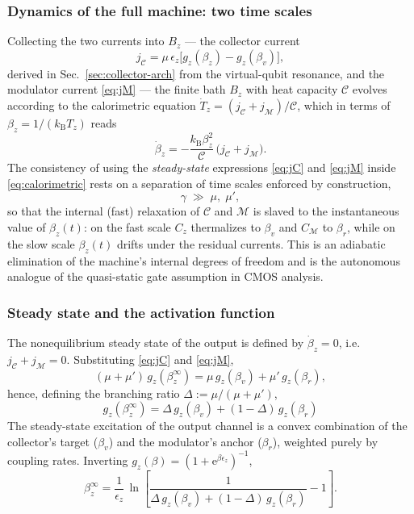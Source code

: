 \documentclass[11pt,a4paper]{article}
\theoremstyle{definition}
\theoremstyle{remark}
\newcommand{\ee}{\mathrm{e}}
\newcommand{\kB}{k_{\mathrm{B}}}
\begin{document}
\subsubsection{Dynamics of the full machine: two time scales}
\label{sec:dynamics}
Collecting the two currents into $B_z$ --- the collector current
\begin{equation}
j_\mathcal{C} = \mu\,\epsilon_z\big[g_z(\beta_z)-g_z(\beta_v)\big],
\label{eq:jC}
\end{equation}
derived in Sec.~\ref{sec:collector-arch} from the virtual-qubit
resonance, and the modulator current \eqref{eq:jM} --- the finite bath
$B_z$ with heat capacity $\mathcal{C}$ evolves according to the
calorimetric equation $\dot T_z = (j_\mathcal{C}+j_\mathcal{M})/\mathcal{C}$,
which in terms of $\beta_z = 1/(\kB T_z)$ reads
\begin{equation}
\dot\beta_z
= -\frac{\kB\beta_z^{2}}{\mathcal{C}}\,\big(j_\mathcal{C}+j_\mathcal{M}\big).
\label{eq:calorimetric}
\end{equation}
The consistency of using the \emph{steady-state} expressions
\eqref{eq:jC} and \eqref{eq:jM} inside \eqref{eq:calorimetric} rests on
a separation of time scales enforced by construction,
\begin{equation}
\gamma \;\gg\; \mu,\;\mu' ,
\end{equation}
so that the internal (fast) relaxation of $\mathcal{C}$ and $\mathcal{M}$
is slaved to the instantaneous value of $\beta_z(t)$: on the fast scale
$C_z$ thermalizes to $\beta_v$ and $C_\mathcal{M}$ to $\beta_r$, while on
the slow scale $\beta_z(t)$ drifts under the residual currents. This is
an adiabatic elimination of the machine's internal degrees of freedom
and is the autonomous analogue of the quasi-static gate assumption in
CMOS analysis.
 
\subsubsection{Steady state and the activation function}
\label{sec:activation}
The nonequilibrium steady state of the output is defined by
$\dot\beta_z=0$, i.e.\ $j_\mathcal{C}+j_\mathcal{M}=0$. Substituting
\eqref{eq:jC} and \eqref{eq:jM},
\begin{equation}
(\mu+\mu')\,g_z(\beta_z^\infty)
= \mu\, g_z(\beta_v) + \mu'\, g_z(\beta_r),
\end{equation}
hence, defining the branching ratio $\Delta := \mu/(\mu+\mu')$,
\begin{equation}
\boxed{\;
g_z(\beta_z^\infty)
= \Delta\, g_z(\beta_v) + (1-\Delta)\, g_z(\beta_r)
\;}
\label{eq:ss_condition}
\end{equation}
The steady-state excitation of the output channel is a convex
combination of the collector's target ($\beta_v$) and the modulator's
anchor ($\beta_r$), weighted purely by coupling rates. Inverting
$g_z(\beta) = (1+\ee^{\beta\epsilon_z})^{-1}$,
\begin{equation}
\beta_z^\infty
= \frac{1}{\epsilon_z}\,
\ln\!\left[\frac{1}{\Delta\, g_z(\beta_v)+(1-\Delta)\,g_z(\beta_r)}-1\right].
\label{eq:betainf_general}
\end{equation}
 
\end{document}
